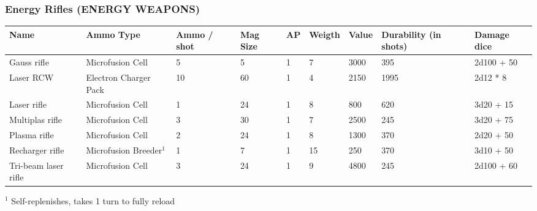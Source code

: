 
\subsubsection{Energy Rifles (ENERGY WEAPONS)}
\begin{longtable}{|p{3.2cm}|p{2.4cm}|p{1.3cm}|p{.9cm}|p{0.6cm}|p{1.3cm}|p{1cm}|p{2cm}|p{3.2cm}|}
\hline
\bfseries Name & \bfseries Ammo Type & \bfseries Ammo / shot & \bfseries Mag Size & \bfseries AP & \bfseries Weigth & \bfseries Value & \bfseries Durability (in shots) & \bfseries Damage dice \\
\hline
\endhead
Gauss rifle & Microfusion Cell & 5 & 5 & 1 & 7 & 3000 & 395 & 2d100 + 50 \\
Laser RCW & Electron Charger Pack & 10 & 60 & 1 & 4 & 2150 & 1995 & 2d12 * 8 \\
Laser rifle & Microfusion Cell & 1 & 24 & 1 & 8 & 800 & 620 & 3d20 + 15 \\
Multiplas rifle & Microfusion Cell & 3 & 30 & 1 & 7 & 2500 & 245 & 3d20 + 75 \\
Plasma rifle & Microfusion Cell & 2 & 24 & 1 & 8 & 1300 & 370 & 2d20 + 50 \\
Recharger rifle & Microfusion Breeder$^1$ & 1 & 7 & 1 & 15 & 250 & 370 & 3d10 + 50 \\
Tri-beam laser rifle & Microfusion Cell & 3 & 24 & 1 & 9 & 4800 & 245 & 2d100 + 60 \\
\hline
\end{longtable}
$^1$  Self-replenishes, takes 1 turn to fully reload